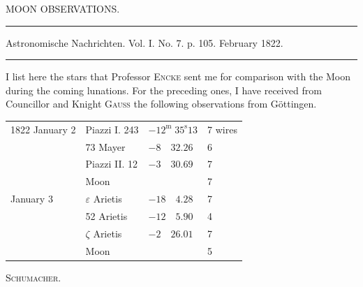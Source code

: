 \clearpage
{}
\begin{center}
{\large MOON OBSERVATIONS.}

\noindent\rule{\linewidth}{0.4pt}

Astronomische Nachrichten. Vol. I. No. 7. p. 105. February 1822.

\noindent\rule{\linewidth}{0.4pt}
\end{center}

I list here the stars that Professor \textsc{Encke} sent me for comparison with the Moon during the coming lunations. For the preceding ones, I have received from Councillor and Knight \textsc{Gauss} the following observations from Göttingen.

\begin{center}
\begin{tabular}{l|l|l|l}
1822 January 2 & Piazzi I. 243 & $-12^{\mathrm{m}}\;35^{\mathrm{s}}13$ & 7 wires \\
 & 73 Mayer & $-8\quad32.26$ & 6 \\
 & Piazzi II. 12 & $-3\quad30.69$ & 7 \\
 & Moon & & 7 \\
January 3 & $\varepsilon$ Arietis & $-18\quad4.28$ & 7 \\
 & 52 Arietis & $-12\quad5.90$ & 4 \\
 & $\zeta$ Arietis & $-2\quad26.01$ & 7 \\
 & Moon & & 5 \\
\end{tabular}
\end{center}

\begin{flushright}
\textsc{Schumacher}.
\end{flushright}

